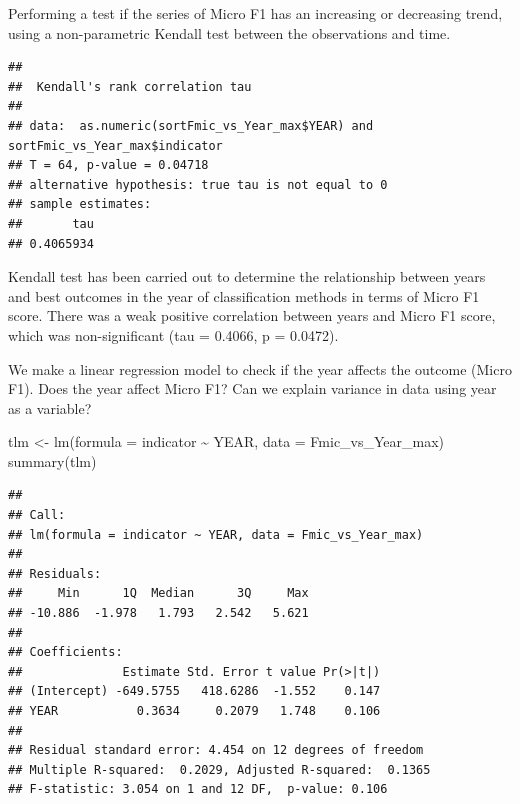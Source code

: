 \documentclass[
]{article}
\newenvironment{Shaded}{\begin{snugshade}}{\end{snugshade}}
\newcommand{\AttributeTok}[1]{\textcolor[rgb]{0.77,0.63,0.00}{#1}}
\newcommand{\FunctionTok}[1]{\textcolor[rgb]{0.00,0.00,0.00}{#1}}
\newcommand{\NormalTok}[1]{#1}
\newcommand{\OtherTok}[1]{\textcolor[rgb]{0.56,0.35,0.01}{#1}}
\newcommand{\SpecialCharTok}[1]{\textcolor[rgb]{0.00,0.00,0.00}{#1}}
\newcommand{\StringTok}[1]{\textcolor[rgb]{0.31,0.60,0.02}{#1}}
\begin{document}
Performing a test if the series of Micro F1 has an increasing or decreasing trend, using a non-parametric Kendall test between the observations and time.

\begin{Shaded}
\end{Shaded}

\begin{verbatim}
## 
##  Kendall's rank correlation tau
## 
## data:  as.numeric(sortFmic_vs_Year_max$YEAR) and sortFmic_vs_Year_max$indicator
## T = 64, p-value = 0.04718
## alternative hypothesis: true tau is not equal to 0
## sample estimates:
##       tau 
## 0.4065934
\end{verbatim}

Kendall test has been carried out to determine the relationship between years and best outcomes in the year of classification methods in terms of Micro F1 score. There was a weak positive correlation between years and Micro F1 score, which was non-significant (tau = 0.4066, p = 0.0472).

We make a linear regression model to check if the year affects the outcome (Micro F1). Does the year affect Micro F1? Can we explain variance in data using year as a variable?

\begin{Shaded}
\begin{Highlighting}[]
\NormalTok{tlm }\OtherTok{\textless{}{-}} \FunctionTok{lm}\NormalTok{(}\AttributeTok{formula =}\NormalTok{ indicator }\SpecialCharTok{\textasciitilde{}}\NormalTok{ YEAR, }\AttributeTok{data =}\NormalTok{ Fmic\_vs\_Year\_max)}
\FunctionTok{summary}\NormalTok{(tlm)}
\end{Highlighting}
\end{Shaded}

\begin{verbatim}
## 
## Call:
## lm(formula = indicator ~ YEAR, data = Fmic_vs_Year_max)
## 
## Residuals:
##     Min      1Q  Median      3Q     Max 
## -10.886  -1.978   1.793   2.542   5.621 
## 
## Coefficients:
##              Estimate Std. Error t value Pr(>|t|)
## (Intercept) -649.5755   418.6286  -1.552    0.147
## YEAR           0.3634     0.2079   1.748    0.106
## 
## Residual standard error: 4.454 on 12 degrees of freedom
## Multiple R-squared:  0.2029, Adjusted R-squared:  0.1365 
## F-statistic: 3.054 on 1 and 12 DF,  p-value: 0.106
\end{verbatim}
\end{document}

